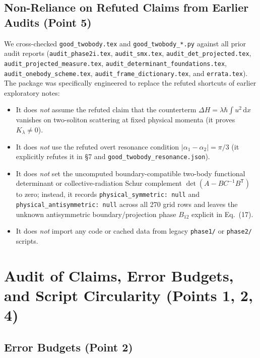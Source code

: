 \documentclass[11pt,a4paper]{article}
\newcommand{\dd}{\mathrm{d}}
\begin{document}
\subsection{Non-Reliance on Refuted Claims from Earlier Audits (Point 5)}

We cross-checked \texttt{good\_twobody.tex} and \texttt{good\_twobody\_*.py} against all prior audit reports (\texttt{audit\_phase2i.tex}, \texttt{audit\_smx.tex}, \texttt{audit\_det\_projected.tex}, \texttt{audit\_projected\_measure.tex}, \texttt{audit\_determinant\_foundations.tex}, \texttt{audit\_onebody\_scheme.tex}, \texttt{audit\_frame\_dictionary.tex}, and \texttt{errata.tex}). The package was specifically engineered to replace the refuted shortcuts of earlier exploratory notes:
\begin{itemize}
\item It does \emph{not} assume the refuted claim that the counterterm $\Delta H = \lambda\hbar\int u^2\,\dd x$ vanishes on two-soliton scattering at fixed physical momenta (it proves $K_\lambda \neq 0$).
\item It does \emph{not} use the refuted overt resonance condition $|\alpha_1-\alpha_2|=\pi/3$ (it explicitly refutes it in \S7 and \texttt{good\_twobody\_resonance.json}).
\item It does \emph{not} set the uncomputed boundary-compatible two-body functional determinant or collective-radiation Schur complement $\det(A-BC^{-1}B^{\mathsf{T}})$ to zero; instead, it records \texttt{physical\_symmetric: null} and \texttt{physical\_antisymmetric: null} across all 270 grid rows and leaves the unknown antisymmetric boundary/projection phase $B_{12}$ explicit in Eq.~(17).
\item It does \emph{not} import any code or cached data from legacy \texttt{phase1/} or \texttt{phase2/} scripts.
\end{itemize}

\section{Audit of Claims, Error Budgets, and Script Circularity (Points 1, 2, 4)}

\subsection{Error Budgets (Point 2)}
\end{document}
